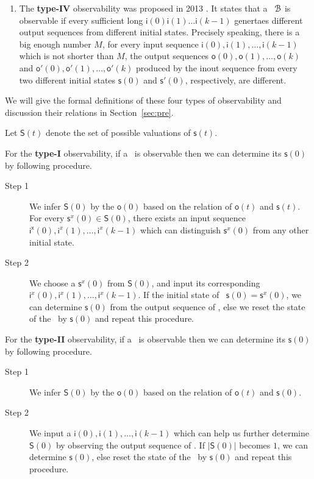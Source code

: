 \begin{enumerate}
\item  The  {\bf type-IV}  observability was  proposed in 2013 \cite{Fornasini2013Observability}. It states that a \BCN\ ${\mathcal{B}}$ is observable if every sufficient long $\mathsf{i}(0)$$\mathsf{i}(1)\ldots$$\mathsf{i}(k-1)$ genertaes different output sequences  from different initial states. Precisely speaking, there is a big enough number $M$, for every  input sequence $\mathsf{i}(0),\mathsf{i}(1),\ldots, \mathsf{i}(k-1)$ which is not shorter than $M$, the output sequences $\mathsf{o}(0), \mathsf{o}(1), \ldots, \mathsf{o}(k)$ and  $\mathsf{o}'(0), \mathsf{o}'(1), \ldots, \mathsf{o}'(k)$ produced by the inout sequence from every two different initial states $\mathsf{s}(0)$ and $\mathsf{s}'(0)$, respectively, are different.
\end{enumerate}
 We will give the formal definitions of these four types of observability and discussion their relations in Section~\ref{sec:pre}.

Let $\mathsf{S}(t)$ denote the set of possible valuations of $\mathsf{s}(t)$.

For the {\bf type-I} observability, if a \BCN\ is observable then we can determine its $\mathsf{s}(0)$ by following procedure. 
\begin{description}
	\item[Step 1] We infer $\mathsf{S}(0)$ by the $\mathsf{o}(0)$ based on the relation of $\mathsf{o}(t)$ and $\mathsf{s}(t)$. For every $\mathsf{s}^x (0)\in\mathsf{S}(0)$, there exists an input sequence $\mathsf{i^x }(0),\mathsf{i}^x (1),\ldots,\mathsf{i}^x (k-1)$ which can distinguish $\mathsf{s}^x (0)$ from any other initial state.
	\item[Step 2] We choose a $\mathsf{s}^x (0)$ from $\mathsf{S}(0)$, and input its corresponding $\mathsf{i}^x (0),\mathsf{i}^x (1),\ldots,\mathsf{i}^x (k-1)$. If the initial state of \BCN\ $\mathsf{s}(0)=\mathsf{s}^x (0)$, we can determine $\mathsf{s}(0)$ from the output sequence of \BCN, else we reset the state of the \BCN\ by $\mathsf{s}(0)$ and repeat this procedure.
	
\end{description}

 For the {\bf type-II} observability, if a \BCN\ is observable then we can determine its $\mathsf{s}(0)$ by following procedure. 
\begin{description}
	\item[Step 1] We infer $\mathsf{S}(0)$ by the $\mathsf{o}(0)$ based on the relation of $\mathsf{o}(t)$ and $\mathsf{s}(0)$. 
	\item[Step 2] We input a $\mathsf{i}(0),\mathsf{i}(1),\ldots,\mathsf{i}(k-1)$ which can help us further determine $\mathsf{S}(0)$ by observing the output sequence of \BCN. If $|\mathsf{S}(0)|$ becomes $1$, we can determine $\mathsf{s}(0)$, else reset the state of the \BCN\ by $\mathsf{s}(0)$ and repeat this procedure.
\end{description}


